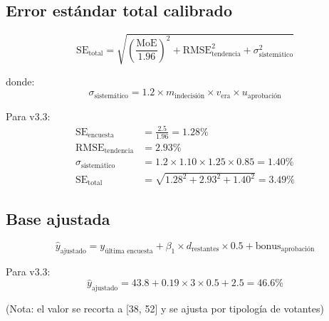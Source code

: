\documentclass[11pt,a4paper]{article}
\begin{document}
\subsection{Error estándar total calibrado}

\begin{equation}
\text{SE}_{\text{total}} = \sqrt{\left(\frac{\text{MoE}}{1.96}\right)^2 + \text{RMSE}_{\text{tendencia}}^2 + \sigma_{\text{sistemático}}^2}
\end{equation}

donde:
\begin{equation}
\sigma_{\text{sistemático}} = 1.2 \times m_{\text{indecisión}} \times v_{\text{era}} \times u_{\text{aprobación}}
\end{equation}

Para v3.3:
\begin{align}
\text{SE}_{\text{encuesta}} &= \frac{2.5}{1.96} = 1.28\% \\
\text{RMSE}_{\text{tendencia}} &= 2.93\% \\
\sigma_{\text{sistemático}} &= 1.2 \times 1.10 \times 1.25 \times 0.85 = 1.40\% \\
\text{SE}_{\text{total}} &= \sqrt{1.28^2 + 2.93^2 + 1.40^2} = 3.49\%
\end{align}

\subsection{Base ajustada}

\begin{equation}
\hat{y}_{\text{ajustado}} = y_{\text{última encuesta}} + \beta_1 \times d_{\text{restantes}} \times 0.5 + \text{bonus}_{\text{aprobación}}
\end{equation}

Para v3.3:
\begin{equation}
\hat{y}_{\text{ajustado}} = 43.8 + 0.19 \times 3 \times 0.5 + 2.5 = 46.6\%
\end{equation}

(Nota: el valor se recorta a [38, 52] y se ajusta por tipología de votantes)
\end{document}
